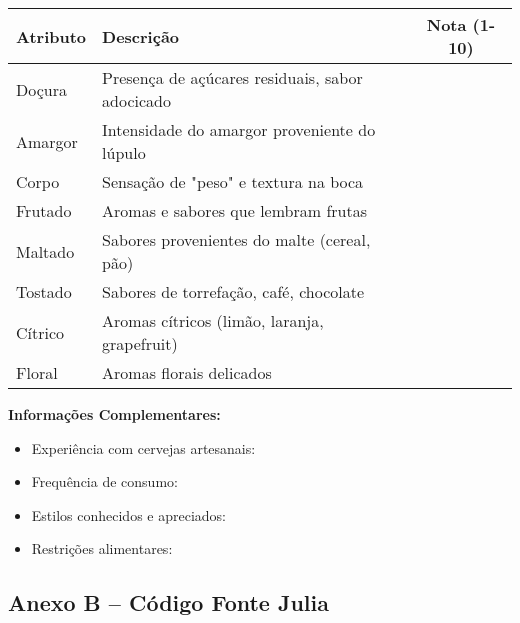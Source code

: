 \documentclass[12pt,a4paper]{article}
\begin{document}
\begin{table}[H]
\centering
\begin{tabular}{|l|p{8cm}|c|}
\hline
\textbf{Atributo} & \textbf{Descrição} & \textbf{Nota (1-10)} \\
\hline
Doçura & Presença de açúcares residuais, sabor adocicado & \underline{\hspace{1cm}} \\
\hline
Amargor & Intensidade do amargor proveniente do lúpulo & \underline{\hspace{1cm}} \\
\hline
Corpo & Sensação de "peso" e textura na boca & \underline{\hspace{1cm}} \\
\hline
Frutado & Aromas e sabores que lembram frutas & \underline{\hspace{1cm}} \\
\hline
Maltado & Sabores provenientes do malte (cereal, pão) & \underline{\hspace{1cm}} \\
\hline
Tostado & Sabores de torrefação, café, chocolate & \underline{\hspace{1cm}} \\
\hline
Cítrico & Aromas cítricos (limão, laranja, grapefruit) & \underline{\hspace{1cm}} \\
\hline
Floral & Aromas florais delicados & \underline{\hspace{1cm}} \\
\hline
\end{tabular}
\end{table}

\textbf{Informações Complementares:}

\begin{itemize}
\item Experiência com cervejas artesanais: \underline{\hspace{4cm}}
\item Frequência de consumo: \underline{\hspace{4cm}}
\item Estilos conhecidos e apreciados: \underline{\hspace{6cm}}
\item Restrições alimentares: \underline{\hspace{4cm}}
\end{itemize}

\subsection{Anexo B -- Código Fonte Julia}
\end{document}
